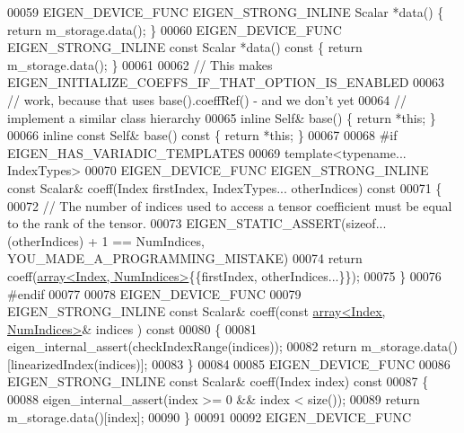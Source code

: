 \begin{DoxyCode}
00059     EIGEN\_DEVICE\_FUNC EIGEN\_STRONG\_INLINE Scalar                   *data()                        \{ \textcolor{keywordflow}{return} 
      m\_storage.data(); \}
00060     EIGEN\_DEVICE\_FUNC EIGEN\_STRONG\_INLINE \textcolor{keyword}{const} Scalar             *data()\textcolor{keyword}{                  const }\{ \textcolor{keywordflow}{return} 
      m\_storage.data(); \}
00061 
00062     \textcolor{comment}{// This makes EIGEN\_INITIALIZE\_COEFFS\_IF\_THAT\_OPTION\_IS\_ENABLED}
00063     \textcolor{comment}{// work, because that uses base().coeffRef() - and we don't yet}
00064     \textcolor{comment}{// implement a similar class hierarchy}
00065     \textcolor{keyword}{inline} Self& base()             \{ \textcolor{keywordflow}{return} *\textcolor{keyword}{this}; \}
00066     \textcolor{keyword}{inline} \textcolor{keyword}{const} Self& base()\textcolor{keyword}{ const }\{ \textcolor{keywordflow}{return} *\textcolor{keyword}{this}; \}
00067 
00068 \textcolor{preprocessor}{#if EIGEN\_HAS\_VARIADIC\_TEMPLATES}
00069     \textcolor{keyword}{template}<\textcolor{keyword}{typename}... IndexTypes>
00070     EIGEN\_DEVICE\_FUNC EIGEN\_STRONG\_INLINE \textcolor{keyword}{const} Scalar& coeff(Index firstIndex, IndexTypes... otherIndices)\textcolor{keyword}{
       const}
00071 \textcolor{keyword}{    }\{
00072       \textcolor{comment}{// The number of indices used to access a tensor coefficient must be equal to the rank of the tensor.}
00073       EIGEN\_STATIC\_ASSERT(\textcolor{keyword}{sizeof}...(otherIndices) + 1 == NumIndices, YOU\_MADE\_A\_PROGRAMMING\_MISTAKE)
00074       \textcolor{keywordflow}{return} coeff(\hyperlink{class_eigen_1_1array}{array<Index, NumIndices>}\{\{firstIndex, otherIndices...\}\});
00075     \}
00076 \textcolor{preprocessor}{#endif}
00077 
00078     EIGEN\_DEVICE\_FUNC
00079     EIGEN\_STRONG\_INLINE \textcolor{keyword}{const} Scalar& coeff(\textcolor{keyword}{const} \hyperlink{class_eigen_1_1array}{array<Index, NumIndices>}& indices
      )\textcolor{keyword}{ const}
00080 \textcolor{keyword}{    }\{
00081       eigen\_internal\_assert(checkIndexRange(indices));
00082       \textcolor{keywordflow}{return} m\_storage.data()[linearizedIndex(indices)];
00083     \}
00084 
00085     EIGEN\_DEVICE\_FUNC
00086     EIGEN\_STRONG\_INLINE \textcolor{keyword}{const} Scalar& coeff(Index index)\textcolor{keyword}{ const}
00087 \textcolor{keyword}{    }\{
00088       eigen\_internal\_assert(index >= 0 && index < size());
00089       \textcolor{keywordflow}{return} m\_storage.data()[index];
00090     \}
00091 
00092     EIGEN\_DEVICE\_FUNC

\end{DoxyCode}
